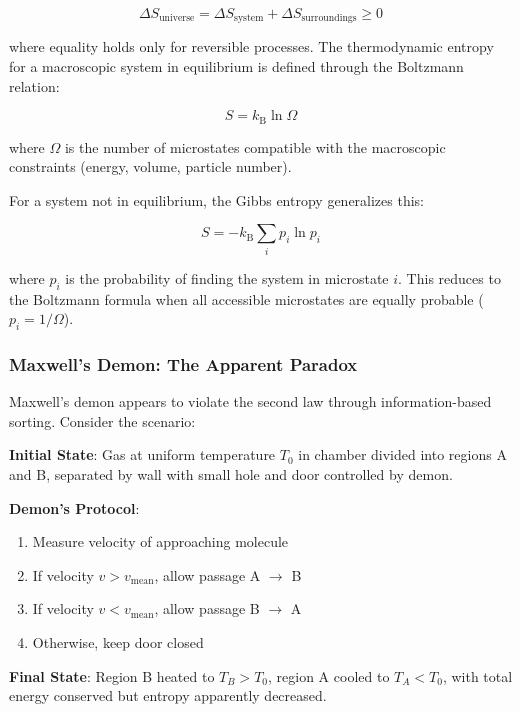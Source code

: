 \documentclass[11pt,a4paper]{article}
\newcommand{\kB}{k_\text{B}}
\begin{document}
\begin{equation}
\Delta S_{\text{universe}} = \Delta S_{\text{system}} + \Delta S_{\text{surroundings}} \geq 0
\end{equation}

where equality holds only for reversible processes. The thermodynamic entropy for a macroscopic system in equilibrium is defined through the Boltzmann relation\cite{boltzmann1877beziehung}:

\begin{equation}
S = \kB \ln \Omega
\end{equation}

where $\Omega$ is the number of microstates compatible with the macroscopic constraints (energy, volume, particle number).

For a system not in equilibrium, the Gibbs entropy generalizes this:

\begin{equation}
S = -\kB \sum_i p_i \ln p_i
\end{equation}

where $p_i$ is the probability of finding the system in microstate $i$. This reduces to the Boltzmann formula when all accessible microstates are equally probable ($p_i = 1/\Omega$).

\subsubsection{Maxwell's Demon: The Apparent Paradox}

Maxwell's demon appears to violate the second law through information-based sorting\cite{maxwell1871theory}. Consider the scenario:

\textbf{Initial State}: Gas at uniform temperature $T_0$ in chamber divided into regions A and B, separated by wall with small hole and door controlled by demon.

\textbf{Demon's Protocol}:
\begin{enumerate}
\item Measure velocity of approaching molecule
\item If velocity $v > v_{\text{mean}}$, allow passage A $\to$ B
\item If velocity $v < v_{\text{mean}}$, allow passage B $\to$ A
\item Otherwise, keep door closed
\end{enumerate}

\textbf{Final State}: Region B heated to $T_B > T_0$, region A cooled to $T_A < T_0$, with total energy conserved but entropy apparently decreased.
\end{document}
